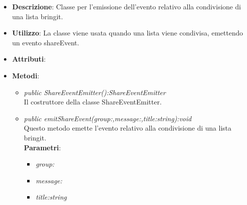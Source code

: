 \begin{itemize}
\item \textbf{Descrizione}: Classe per l'emissione dell'evento relativo alla condivisione di una lista bringit.
\item \textbf{Utilizzo}: La classe viene usata quando una lista viene condivisa, emettendo un evento shareEvent.
\item \textbf{Attributi}: 
\item \textbf{Metodi}:
	\begin{itemize}
	\item \textit{public ShareEventEmitter():ShareEventEmitter}\\
	Il costruttore della classe ShareEventEmitter.
	\item \textit{public emitShareEvent(group:,message:,title:string):void}\\
	Questo metodo emette l'evento relativo alla condivisione di una lista bringit.
					\\ \textbf{Parametri}: \begin{itemize}
			\item \textit{group:}\\
			
			\item \textit{message:}\\
			
			\item \textit{title:string}\\
			
					\end{itemize}
	\end{itemize}
\end{itemize}